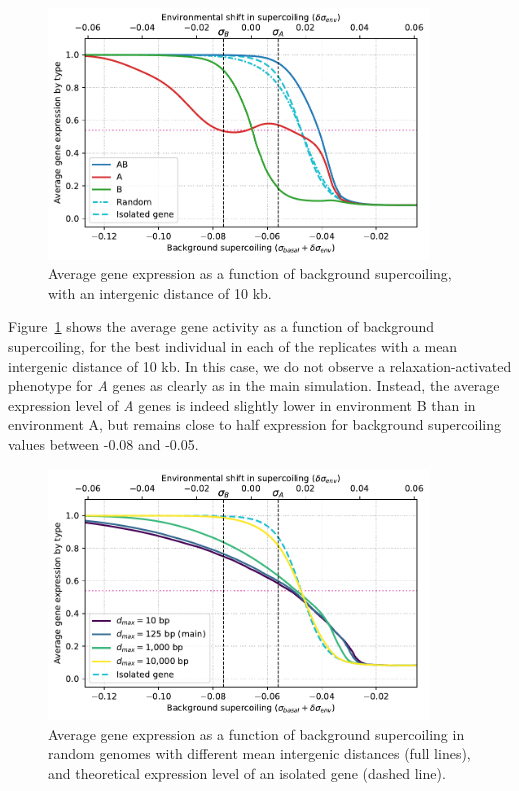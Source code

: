 \begin{figure}
\centering
\includegraphics[width=0.9\textwidth]{param/mean-intergene/inter-10k/activity_sigmas_avg.pdf}
\caption[Average gene expression as a function of background supercoiling, with an intergenic distance of 10 kb]{Average gene expression as a function of background supercoiling, with an intergenic distance of 10 kb.}
\label{fig:param:mean-intergene-10kb-activ-by-sigma}
\end{figure}

Figure~\ref{fig:param:mean-intergene-10kb-activ-by-sigma} shows the average gene activity as a function of background supercoiling, for the best individual in each of the replicates with a mean intergenic distance of 10 kb.
In this case, we do not observe a relaxation-activated phenotype for \emph{A} genes as clearly as in the main simulation.
Instead, the average expression level of \emph{A} genes is indeed slightly lower in environment B than in environment A, but remains close to half expression for background supercoiling values between -0.08 and -0.05.

\begin{figure}
\centering
\includegraphics[width=0.9\textwidth]{param/mean-intergene/random_activ_per_sigma.pdf}
\caption[Average gene expression as a function of background supercoiling, with increasing mean intergenic distances, in random genomes]{Average gene expression as a function of background supercoiling in random genomes with different mean intergenic distances (full lines), and theoretical expression level of an isolated gene (dashed line).}
\label{fig:param:mean-intergene-random-activ-by-sigma}
\end{figure}

